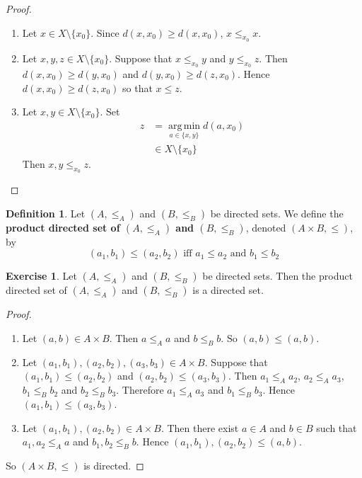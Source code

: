 \documentclass[12pt]{amsart}
\theoremstyle{definition}
\newtheorem{defn}[definition]{Definition}
\newtheorem{ex}[definition]{Exercise}
\DeclareMathOperator*{\argmin}{arg\,min}
\begin{document}
	\begin{proof}\
		\begin{enumerate}
			\item Let $x \in X \setminus \{x_0\}$. Since $d(x, x_0) \geq d(x, x_0)$, $x \leq_{x_0} x$.
			\item Let $x, y, z \in X \setminus \{x_0\}$. Suppose that $x \leq_{x_0} y$ and $y \leq_{x_0} z$. Then $d(x, x_0) \geq d(y, x_0)$ and $d(y, x_0) \geq d(z, x_0)$. Hence $d(x, x_0) \geq d(z, x_0)$ so that $x \leq z$.
			\item Let $x,y \in X \setminus \{x_0\}$. Set 
			\begin{align*}
				z 
				&= \argmin\limits_{a \in \{x, y\}} d(a, x_0) \\ 
				& \in X \setminus \{x_0\} 
			\end{align*}
			Then $x, y \leq_{x_0} z$.
		\end{enumerate}
	\end{proof}

	\begin{defn}
		Let $(A, \leq_A)$ and $(B, \leq_B)$ be directed sets. We define the \textbf{product directed set of $(A, \leq_A)$ and $(B, \leq_B)$}, denoted $(A \times B, \leq)$, by 
		$$(a_1, b_1) \leq (a_2, b_2) \text{ iff } a_1 \leq a_2 \text{ and } b_1 \leq b_2$$
	\end{defn}

	\begin{ex}
		Let $(A, \leq_A)$ and $(B, \leq_B)$ be directed sets. Then the product directed set of $(A, \leq_A)$ and $(B, \leq_B)$ is a directed set.
	\end{ex}

	\begin{proof}\
		\begin{enumerate}
			\item Let $(a, b) \in A \times B$. Then $a \leq_A a$ and $b \leq_B b$. So $(a, b) \leq (a ,b)$.
			\item Let $(a_1, b_1), (a_2, b_2), (a_3, b_3) \in A \times B$. Suppose that $(a_1, b_1) \leq (a_2, b_2)$ and $(a_2, b_2) \leq (a_3, b_3)$. Then $a_1 \leq_A a_2$, $a_2 \leq_A a_3$, $b_1 \leq_B b_2$ and $b_2 \leq_B b_3$. Therefore $a_1 \leq_A a_3$ and $b_1 \leq_B b_3$. Hence $(a_1, b_1) \leq (a_3, b_3)$.
			\item Let $(a_1, b_1), (a_2, b_2) \in A \times B$. Then there exist $a \in A$ and $b \in B$ such that $a_1, a_2 \leq_A a$ and $b_1, b_2 \leq_B b$. Hence $(a_1, b_1), (a_2, b_2) \leq (a, b)$.
		\end{enumerate}
		So $(A \times B, \leq)$ is directed.
	\end{proof}
	
\end{document}
